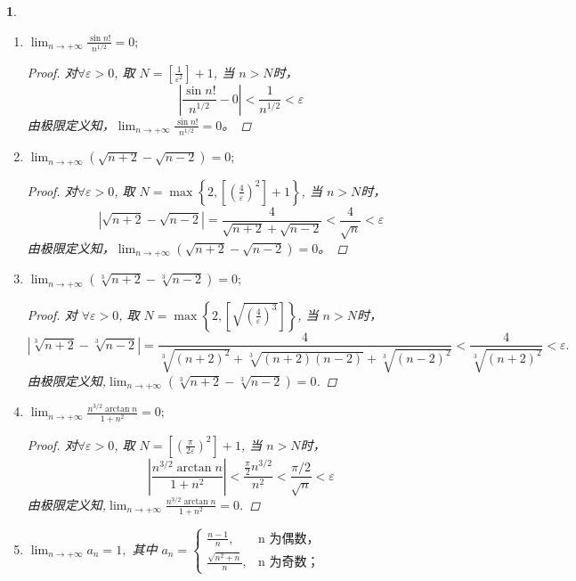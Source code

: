 \documentclass[utf8]{book}
\newtheorem{example}{}[section]             %
\begin{document}
\begin{example}
\begin{enumerate}
        \item $\displaystyle \lim_{n\to +\infty}\frac{\sin n!}{n^{1/2}} = 0;$
        \begin{proof}
         对$\forall \varepsilon > 0$, 取 $N = \left [\frac{1}{\varepsilon^2}\right ] + 1$, 当 $n > N$时，
        $$\left | \frac{\sin n!}{n^{1/2}} - 0\right | < \frac{1}{n^{1/2}} < \varepsilon$$
        由极限定义知，$\displaystyle\lim_{n\to +\infty}\frac{\sin n!}{n^{1/2}} = 0$。  
        \end{proof}
        
        \item $\displaystyle \lim_{n\to +\infty}(\sqrt{n+2}-\sqrt{n-2}) = 0;$
        \begin{proof}
         对$\forall \varepsilon > 0$, 取 $N = \max\left\{2, \left [ \left(\frac{4}{\varepsilon}\right)^2\right ] + 1\right\}$, 当 $n > N$时，
        $$\left | \sqrt{n+2}-\sqrt{n-2}\right | = \frac{4}{\sqrt{n+2}+\sqrt{n-2}} < \frac{4}{\sqrt{n}} < \varepsilon$$
        由极限定义知，$\displaystyle\lim_{n\to +\infty}(\sqrt{n+2}-\sqrt{n-2}) = 0$。  
        \end{proof}
        
        \item $\displaystyle \lim_{n\to +\infty}(\sqrt[3]{n+2}-\sqrt[3]{n-2}) = 0;$
        \begin{proof}
         对 $\forall \varepsilon > 0$, 取 $N = \max\left\{2, \left [ \sqrt{\left(\frac{4}{\varepsilon}\right)^3}\right ]\right\}$, 当 $n > N$时，
$$\left|\sqrt[3]{n+2}-\sqrt[3]{n-2}\right| = \frac{4}{\sqrt[3]{(n+2)^2}+\sqrt[3]{(n+2)(n-2)} + \sqrt[3]{(n-2)^2}} < \frac{4}{\sqrt[3]{(n+2)^2}}< \varepsilon.$$
        由极限定义知,$\displaystyle\lim_{n\to +\infty}(\sqrt[3]{n+2}-\sqrt[3]{n-2}) = 0$.  
        \end{proof}
        
        \item $\displaystyle \lim_{n\to +\infty}\frac{n^{3/2}\arctan{n}}{1+n^2} = 0;$
        \begin{proof}
         对$\forall \varepsilon > 0$, 取 $N = \left [ \left(\frac{\pi}{2\varepsilon}\right)^2\right ] + 1$, 当 $n > N$时，
         $$\left | \frac{n^{3/2}\arctan{n}}{1+n^2} \right | < \frac{\frac{\pi}{2}n^{3/2}}{n^2} < \frac{\pi / 2}{\sqrt{n}} < \varepsilon$$
        由极限定义知,$\displaystyle\lim_{n\to +\infty}\frac{n^{3/2}\arctan{n}}{1+n^2} = 0$.  
        \end{proof} 
        
        \item $\displaystyle \lim_{n\to +\infty}a_n = 1,$ 其中 
        $a_n = 
         \begin{cases}
         \displaystyle\frac{n-1}{n}, &\text{n 为偶数，}\\
         \displaystyle\frac{\sqrt{n^2+ n}}{n}, &\text{n 为奇数；}
		\end{cases}$      
		

\end{enumerate}
\end{example}
\end{document}
